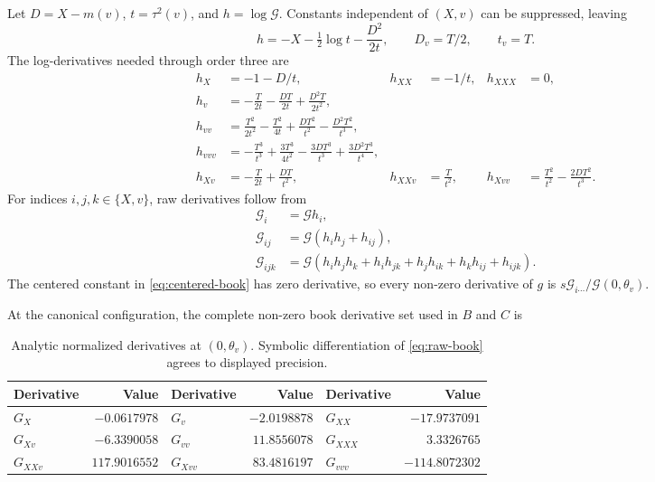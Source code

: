 \documentclass[11pt]{article}
\begin{document}
Let $D=X-m(v)$, $t=\tau^2(v)$, and $h=\log\mathcal G$.  Constants independent
of $(X,v)$ can be suppressed, leaving
\[
h=-X-\tfrac12\log t-\frac{D^2}{2t},
\qquad D_v=T/2,\qquad t_v=T.
\]
The log-derivatives needed through order three are
\begin{align}
h_X&=-1-D/t,& h_{XX}&=-1/t,&h_{XXX}&=0,\nonumber\\
h_v&=-\frac{T}{2t}-\frac{DT}{2t}+\frac{D^2T}{2t^2},\nonumber\\
h_{vv}&=\frac{T^2}{2t^2}-\frac{T^2}{4t}
       +\frac{DT^2}{t^2}-\frac{D^2T^2}{t^3},\nonumber\\
h_{vvv}&=-\frac{T^3}{t^3}+\frac{3T^3}{4t^2}
       -\frac{3DT^3}{t^3}+\frac{3D^2T^3}{t^4},\label{eq:log-derivatives}\\
h_{Xv}&=-\frac{T}{2t}+\frac{DT}{t^2},&
h_{XXv}&=\frac{T}{t^2},&
h_{Xvv}&=\frac{T^2}{t^2}-\frac{2DT^2}{t^3}.\nonumber
\end{align}
For indices $i,j,k\in\{X,v\}$, raw derivatives follow from
\begin{align}
\mathcal G_i&=\mathcal G h_i,\nonumber\\
\mathcal G_{ij}&=\mathcal G(h_ih_j+h_{ij}),\nonumber\\
\mathcal G_{ijk}&=\mathcal G(h_ih_jh_k+h_ih_{jk}+h_jh_{ik}+h_kh_{ij}+h_{ijk}).
\label{eq:bell-derivatives}
\end{align}
The centered constant in \cref{eq:centered-book} has zero derivative, so every non-zero
derivative of $g$ is $s\mathcal G_{i\cdots}/\mathcal G(0,\theta_v)$.

At the canonical configuration, the complete non-zero book derivative set used in $B$ and
$C$ is
\begin{table}[!htbp]
\centering
\begin{tabular}{lrlrlr}
\toprule
Derivative & Value & Derivative & Value & Derivative & Value\\
\midrule
$G_X$ & $-0.0617978$ & $G_v$ & $-2.0198878$ & $G_{XX}$ & $-17.9737091$\\
$G_{Xv}$ & $-6.3390058$ & $G_{vv}$ & $11.8556078$ & $G_{XXX}$ & $3.3326765$\\
$G_{XXv}$ & $117.9016552$ & $G_{Xvv}$ & $83.4816197$ & $G_{vvv}$ & $-114.8072302$\\
\bottomrule
\end{tabular}
\caption{Analytic normalized derivatives at $(0,\theta_v)$.  Symbolic differentiation of
\cref{eq:raw-book} agrees to displayed precision.}
\label{tab:book-derivatives}
\end{table}
\end{document}
